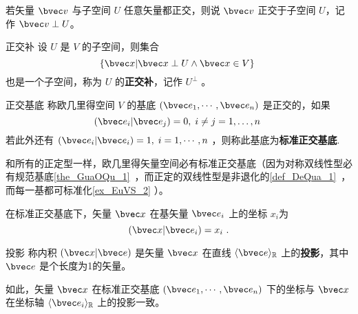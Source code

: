 若矢量 $\bvec v$ 与子空间 $U$ 任意矢量都正交，则说 $\bvec v$ 正交于子空间 $U$，记作 $\bvec v\perp U$。
\begin{definition}{正交补}
设 $U$ 是 $V$ 的子空间，则集合
\begin{equation}
\{\bvec x|\bvec x\perp U\wedge\bvec x\in V\}~
\end{equation}
也是一个子空间，称为 $U$ 的\textbf{正交补}，记作 $U^{\perp}$ 。
\end{definition}
\begin{definition}{正交基底}
称欧几里得空间 $V$ 的基底 $(\bvec e_1,\cdots,\bvec e_n)$ 是正交的，如果
\begin{equation}
(\bvec e_i|\bvec e_j)=0,\;i\neq j=1,\dots,n~
\end{equation}
若此外还有 $(\bvec e_i|\bvec e_i)=1,\;i=1,\cdots ,n$ ，则称此基底为\textbf{标准正交基底}.
\end{definition}

和所有的正定型一样，欧几里得矢量空间必有标准正交基底（因为对称双线性型必有规范基底\autoref{the_GuaOQu_1}~，而正定的双线性型是非退化的\autoref{def_DeQua_1}~，而每一基都可标准化\autoref{ex_EuVS_2} ）。
\begin{exercise}{}
在标准正交基底下，矢量 $\bvec x$ 在基矢量 $\bvec e_i$ 上的坐标 $x_i$为
\begin{equation}
(\bvec x|\bvec e_i)=x_i~.
\end{equation}
\end{exercise}
\begin{definition}{投影}
称内积 $(\bvec x|\bvec e)$ 是矢量 $\bvec x$ 在直线 $\langle\bvec e\rangle_{\mathbb R}$ 上的\textbf{投影}，其中 $\bvec e$ 是个长度为1的矢量。  
\end{definition}
如此，矢量 $\bvec x$ 在标准正交基底 $(\bvec e_1,\cdots,\bvec e_n)$ 下的坐标与 $\bvec x$ 在坐标轴 $\langle\bvec e_i\rangle_\mathbb{R}$ 上的投影一致。 
